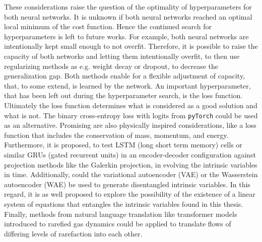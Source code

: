 These considerations raise the question of the optimality of hyperparameters for both neural networks. It is unknown if both neural networks reached an optimal local minimum of the cost function. Hence the continued search for hyperparameters is left to future works. For example, both neural networks are intentionally kept small enough to not overfit. Therefore, it is possible to raise the capacity of both networks and letting them intentionally overfit, to then use regularizing methods as e.g. weight decay or dropout, to decrease the generalization gap. Both methods enable for a flexible adjustment of capacity, that, to some extend, is learned by the network. An important hyperparameter, that has been left out during the hyperparameter search, is the loss function. Ultimately the loss function determines what is considered as a good solution and what is not. The binary cross-entropy loss with logits from \texttt{pyTorch} could be used as an alternative. Promising are also physically inspired considerations, like a loss function that includes the conservation of mass, momentum, and energy.\\
Furthermore, it is proposed, to test LSTM\cite{HochSchm97} (long short term memory) cells or similar GRUs (gated recurrent units) in an encoder-decoder configuration against projection methods like the Galerkin projection, in evolving the intrinsic variables in time. Additionally, could the variational autoencoder (VAE)\cite{kingma2014autoencoding} or the Wasserstein autoencoder (WAE)\cite{tolstikhin2019wasserstein} be used to generate disentangled intrinsic variables. In this regard, it is as well proposed to explore the possibility of the existence of a linear system of equations that entangles the intrinsic variables found in this thesis. 
Finally, methods from natural language translation like transformer models introduced to rarefied gas dynamics could be applied to translate flows of differing levels of rarefaction into each other.
 